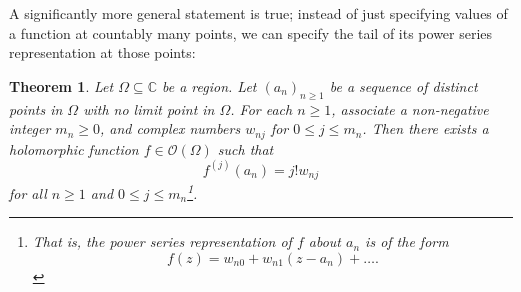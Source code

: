 \documentclass[11pt]{article}
\theoremstyle{thmstyle}
\newtheorem{theorem}{Theorem}[section]
\theoremstyle{defstyle}
\newcommand{\bbC}{\mathbb{C}}
\newcommand{\scrO}{\mathscr{O}} %
\renewcommand{\le}{\leqslant}
\renewcommand{\ge}{\geqslant}
\begin{document}
A significantly more general statement is true; instead of just specifying values of a function at countably many points, we can specify the tail of its power series representation at those points: 
\begin{theorem}
    Let $\Omega\subseteq\bbC$ be a region. Let $(a_n)_{n\ge 1}$ be a sequence of distinct points in $\Omega$ with no limit point in $\Omega$. For each $n\ge 1$, associate a non-negative integer $m_n\ge 0$, and complex numbers $w_{nj}$ for $0\le j\le m_n$. Then there exists a holomorphic function $f\in\scrO(\Omega)$ such that 
    \begin{equation*}
        f^{(j)}(a_n) = j! w_{nj}
    \end{equation*}
    for all $n\ge 1$ and $0\le j\le m_n$\footnote{That is, the power series representation of $f$ about $a_n$ is of the form 
    \begin{equation*}f(z) = w_{n0} + w_{n1}(z - a_n) + \dots .\end{equation*}}.
\end{theorem}
\end{document}

